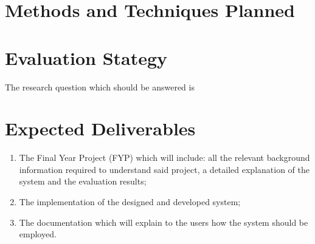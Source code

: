 \documentclass{csfyp}
\begin{document}
\section{Methods and Techniques Planned}



\section{Evaluation Stategy}

The research question which should be answered is


\section{Expected Deliverables}

\begin{enumerate}

  \item The Final Year Project (FYP) which will include: all the relevant background information required to understand said project, a detailed explanation of the system and the evaluation results; 

  \item The implementation of the designed and developed system;

  \item The documentation which will explain to the users how the system should be employed. 

\end{enumerate}



\nocite{*}

\end{document}
